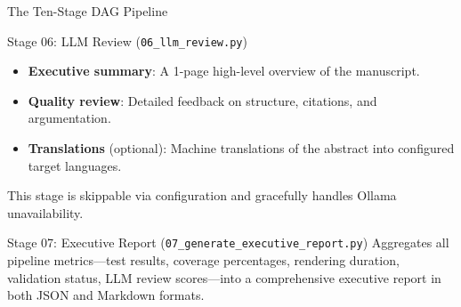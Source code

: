 \documentclass[
  ignorenonframetext,
]{beamer}
\providecommand{\tightlist}{%
  \setlength{\itemsep}{0pt}\setlength{\parskip}{0pt}}
\begin{document}
\begin{frame}[fragile]{The Ten-Stage DAG Pipeline}
\begin{block}{Stage 06: LLM Review (\texttt{06\_llm\_review.py})}
\begin{itemize}
\tightlist
\item
  \textbf{Executive summary}: A 1-page high-level overview of the
  manuscript.
\item
  \textbf{Quality review}: Detailed feedback on structure, citations,
  and argumentation.
\item
  \textbf{Translations} (optional): Machine translations of the abstract
  into configured target languages.
\end{itemize}

This stage is skippable via configuration and gracefully handles Ollama
unavailability.
\end{block}

\begin{block}{Stage 07: Executive Report
(\texttt{07\_generate\_executive\_report.py})}
\protect{}\label{stage-07-executive-report-07_generate_executive_report.py}
Aggregates all pipeline metrics---test results, coverage percentages,
rendering duration, validation status, LLM review scores---into a
comprehensive executive report in both JSON and Markdown formats.
\end{block}
\end{frame}
\end{document}

